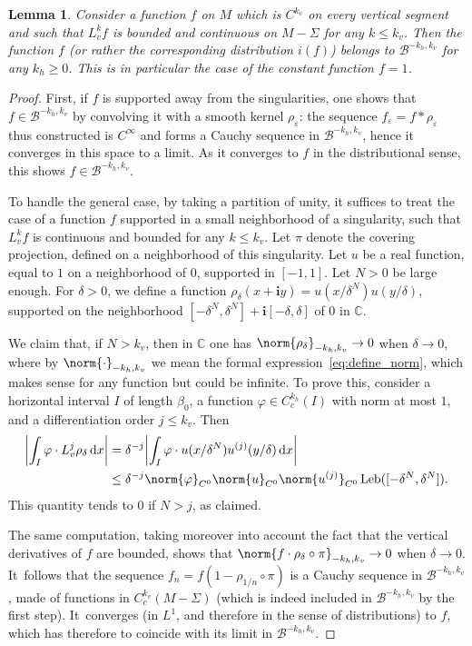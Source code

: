 \documentclass[10pt]{amsart}
\newcommand{\boB}{\mathcal{B}}
\newcommand{\CC}{\mathbb{C}}
\newcommand{\dd}{\mathop{}\!\mathrm{d}}
\newcommand{\ic}{\mathbf{i}}
\newcommand{\absgg}[1]{\biggl \lvert#1\biggr\rvert}
\DeclareMathOperator{\Leb}{Leb}
\let\epsilon\varepsilon
\let\phi\varphi
\newtheorem{lem}[thm]{Lemma}
\theoremstyle{definition}
\numberwithin{equation}{section}
\begin{document}
\begin{lem}
\label{lem:boB_riche} Consider a function $f$ on $M$ which is $C^{k_v}$ on
every vertical segment and such that $L_v^k f$ is bounded and continuous on
$M-\Sigma$ for any $k \leq k_v$. Then the function $f$ (or rather the
corresponding distribution $i(f)$) belongs to $\boB^{-k_h, k_v}$ for any
$k_h\geq 0$. This is in particular the case of the constant function $f=1$.
\end{lem}
\begin{proof}
First, if $f$ is supported away from the singularities, one shows that \hbox{$f \in
\boB^{-k_h, k_v}$} by convolving it with a smooth kernel $\rho_\epsilon$:
the sequence $f_\epsilon = f * \rho_\epsilon$ thus constructed is $C^\infty$ and forms
a Cauchy sequence in $\boB^{-k_h, k_v}$, hence it converges in this space to a limit.
As it converges to $f$ in the distributional sense, this shows $f \in \boB^{-k_h, k_v}$.

To handle the general case, by taking a partition of unity, it suffices to
treat the case of a function $f$ supported in a small neighborhood of a
singularity, such that $L_v^k f$ is continuous and bounded for any $k \leq
k_v$. Let $\pi$ denote the covering projection, defined on a neighborhood of
this singularity. Let $u$ be a real function, equal to $1$ on a neighborhood
of $0$, supported in $[-1,1]$. Let $N>0$ be large enough. For $\delta > 0$,
we define a function $\rho_\delta(x+ \ic y) = u(x/\delta^N) u(y/\delta)$,
supported on the neighborhood $[-\delta^N, \delta^N] + \ic [-\delta, \delta]$
of $0$ in $\CC$.

We claim that, if $N>k_v$, then in $\CC$ one has $\norm{\rho_\delta}_{-k_h,
k_v} \to 0$ when $\delta \to 0$, where by $\norm{\cdot}_{-k_h, k_v}$ we mean the formal
expression~\eqref{eq:define_norm}, which makes sense for any function but could be
infinite. To prove this, consider a horizontal
interval $I$ of length $\beta_0$, a function $\phi \in C_c^{k_h}(I)$ with
norm at most $1$, and a differentiation order $j \leq k_v$. Then
\begin{align*}
\absgg{\int_I \phi \cdot L_v^j \rho_\delta \dd x}
&= \delta^{-j} \absgg{\int_I \phi \cdot u(x/\delta^N) u^{(j)}(y/\delta) \dd x}
\\&\leq \delta^{-j} \norm{\phi}_{C^0} \norm{u}_{C^0} \norm{u^{(j)}}_{C^0} \Leb([-\delta^N, \delta^N]).
\end{align*}
This quantity tends to $0$ if $N>j$, as claimed.

The same computation, taking moreover into account the fact that the vertical
derivatives of $f$ are bounded, shows that $\norm{f \cdot \rho_\delta\circ
\pi}_{-k_h, k_v} \to 0$ when $\delta \to 0$. It~follows that the sequence
$f_n = f (1- \rho_{1/n} \circ \pi)$ is a Cauchy sequence in $\boB^{-k_h,
k_v}$, made of functions in $C^{k_v}_c(M-\Sigma)$ (which is indeed included
in $\boB^{-k_h, k_v}$ by the first step). It~converges (in $L^1$,
and therefore in the sense of distributions) to $f$, which has therefore to
coincide with its limit in $\boB^{-k_h, k_v}$.
\end{proof}
\end{document}

